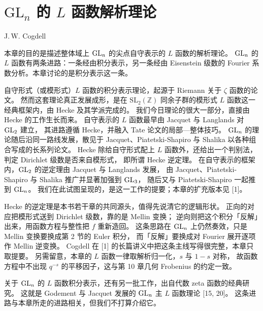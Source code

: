 \chapter{$\mathrm{GL}_n$ 的 \texorpdfstring{$L$}{L} 函数解析理论}\label{ch:09}

\begin{center}
J.\,W. Cogdell
\end{center}

本章的目的是描述整体域上 $\mathrm{GL}_n$ 的尖点自守表示的 $L$ 函数的解析理论。
$\mathrm{GL}_n$ 的 $L$ 函数有两条进路：一条经由积分表示，另一条经由 Eisenstein 级数的
Fourier 系数分析。本章讨论的是积分表示这一条。

自守形式（或模形式）$L$ 函数的积分表示理论，起源于 Riemann 关于 $\zeta$ 函数的论文。
然而这套理论真正发展成形，是在 $\mathrm{SL}_2(\mathbb{Z})$ 同余子群的模形式
$L$ 函数这一经典框架内，由 Hecke 及其学派完成的。
我们今日理论的很大一部分，直接由 Hecke 的工作生长而来。
自守表示的 $L$ 函数最早由 Jacquet 与 Langlands 对 $\mathrm{GL}_2$ 建立，
其进路遵循 Hecke，并融入 Tate 论文的局部—整体技巧。
$\mathrm{GL}_n$ 的理论随后沿同一路线发展，散见于 Jacquet、Piatetski-Shapiro 与 Shalika
以各种组合写成的长系列论文。
Hecke 除给自守形式配上 $L$ 函数外，还给出一个判别法，判定 Dirichlet 级数是否来自模形式，
即所谓 Hecke 逆定理。
在自守表示的框架内，$\mathrm{GL}_2$ 的逆定理由 Jacquet 与 Langlands 发展，
由 Jacquet、Piatetski-Shapiro 与 Shalika 推广并显著加强到 $\mathrm{GL}_3$，
随后又与 Piatetski-Shapiro 一起推到 $\mathrm{GL}_n$。
我们在此试图呈现的，是这一工作的提要；本章的扩充版本见 [1]。
\begin{annote}
Hecke 的逆定理是本书若干章的共同源头，值得先说清它的逻辑形状。
正向的对应把模形式送到 Dirichlet 级数，靠的是 Mellin 变换；
逆向则把这个积分「反解」出来，用函数方程与整性把 $f$ 重新造回。
这条思路在 $\mathrm{GL}_n$ 上仍然奏效，只是 Mellin 变换要换成第 2 节的 Euler 积分，
而「反解」要换成对 Fourier 展开逐项作 Mellin 逆变换。
Cogdell 在 [1] 的长篇讲义中把这条主线写得很完整，本章只取提要。
另需留意，本章的 $L$ 函数一律取解析归一化，$s$ 与 $1-s$ 对称，
故函数方程中不出现 $q^{-s}$ 的平移因子，这与第 10 章几何 Frobenius 的约定一致。
\par{}
\end{annote}

关于 $\mathrm{GL}_n$ 的 $L$ 函数积分表示，还有另一批工作，出自代数 zeta 函数的经典研究。
这就是 Godement 与 Jacquet 发展的 $\mathrm{GL}_n$ 主 $L$ 函数理论 [15, 20]。
这条进路与本章所走的进路相关，但我们不打算介绍它。

